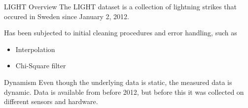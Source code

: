 \documentclass[10pt]{beamer}
\begin{document}
\begin{frame}{LIGHT Overview}
The LIGHT dataset is a collection of lightning strikes that occured in Sweden since January 2, 2012.
\par
Has been subjected to initial cleaning procedures and error handling, such as
\begin{itemize}
	\item Interpolation
	\item Chi-Square filter
\end{itemize}
\vspace{0.5cm}
\begin{alertblock}{Dynamism}
	Even though the underlying data is static, the measured data is dynamic.
	Data is available from before 2012, but before this it was collected on different sensors and hardware.
\end{alertblock}
\end{frame}


\end{document}
